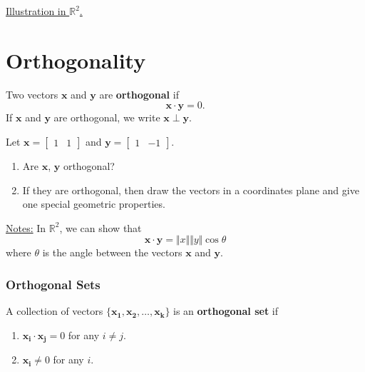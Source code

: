 \documentclass[20pt,a4paper]{extarticle}
\newcounter{example}
\newcounter{definition}
\begin{document}
	\underline{Illustration in $\mathbb{R}^2$.}


\newpage 

\section{Orthogonality}

	\begin{definition}
	Two vectors $\mathbf{x}$ and $\mathbf{y}$ are \textbf{orthogonal} if
		\[
			\mathbf{x} \cdot \mathbf{y} = 0 .
		\]
	If $\mathbf{x}$ and $\mathbf{y}$ are orthogonal, we write $\mathbf{x} \perp \mathbf{y}$.
	\end{definition}

	\begin{example}
	Let $\mathbf{x} = \begin{bmatrix} 1 & 1 \end{bmatrix}$ and $\mathbf{y} = \begin{bmatrix} 1 & -1 \end{bmatrix}$. 
		\begin{enumerate}[label=\alph*)]
			\item Are $\mathbf{x}$, $\mathbf{y}$ orthogonal?
			\item If they are orthogonal, then draw the vectors in a coordinates plane and give one special geometric properties.
		\end{enumerate}
	\end{example}

	\vfill

	\underline{Notes:} In $\mathbb{R}^2$, we can show that
		\[
			\mathbf{x} \cdot \mathbf{y} = \Vert x \Vert \Vert y \Vert \cos \theta
		\]
	where $\theta$ is the angle between the vectors $\mathbf{x}$ and $\mathbf{y}$.

	\newpage 

	\subsubsection{Orthogonal Sets}

	\begin{definition}
	A collection of vectors $\{ \mathbf{x_1} , \mathbf{x_2} , \ldots , \mathbf{x_k} \}$ is an \textbf{orthogonal set} if
		\begin{enumerate}[label=\Circled{\arabic*}]
			\item $\mathbf{x_i} \cdot \mathbf{x_j} = 0$ for any $i \neq j$.
			\item $\mathbf{x_i} \neq 0$ for any $i$.
		\end{enumerate}
	\end{definition}
\end{document}
